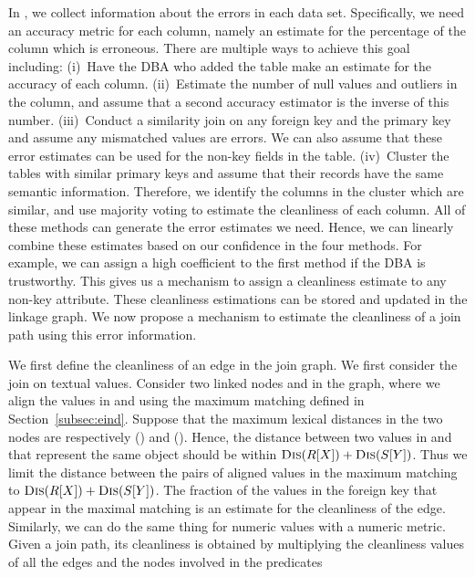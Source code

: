 In \dcv, we collect information about the errors in each data set. 
Specifically, we need an accuracy metric for each column, namely an estimate for the percentage of the column which is erroneous. There are multiple ways to achieve this goal including: 
(i)~Have the DBA who added the table make an estimate for the accuracy of each column. 
(ii)~Estimate the number of null values and outliers in the column, and assume that a second accuracy estimator is the inverse of this number. 
(iii)~Conduct a similarity join on any foreign key and the primary key and assume any mismatched values are errors. We can also assume that these error estimates can be used for the non-key fields in the table. 
(iv)~Cluster the tables with similar primary keys and assume that their records have the same semantic information.  Therefore, we identify the columns in the cluster which are similar, and use majority voting to estimate the cleanliness of each column. 
All of these methods can generate the  error estimates we need. 
Hence, we can linearly combine these estimates based on our confidence in the four methods. For example, we can assign a high coefficient to the first method if the DBA is trustworthy. This gives us a mechanism to assign a cleanliness estimate to any non-key attribute. These cleanliness estimations can be stored and updated in the linkage graph. We now propose a mechanism to estimate the cleanliness of a join path using this error information.


We first define the cleanliness of an edge in the join graph. We first consider the join on textual values. Consider two linked nodes \RX and \SY in the graph, where we align the values in \RX and \SY using the maximum matching defined in Section~\ref{subsec:eind}. Suppose that the maximum lexical distances in the two nodes are respectively \Dis(\RX) and \Dis(\SY). Hence, the distance between two values in \RX and \SY that represent the same object should be within $\textsc{Dis}(R[X])+\textsc{Dis}(S[Y])$. Thus we limit the distance between the pairs of aligned values in the maximum matching to $\textsc{Dis}(R[X])+\textsc{Dis}(S[Y])$. The fraction of the values in the foreign key that appear in the maximal matching is an estimate for the cleanliness of the edge. Similarly, we can do the same thing for numeric values with a numeric metric.
Given a join path, its cleanliness is obtained by multiplying the cleanliness values of all the edges and the nodes involved in the predicates 

